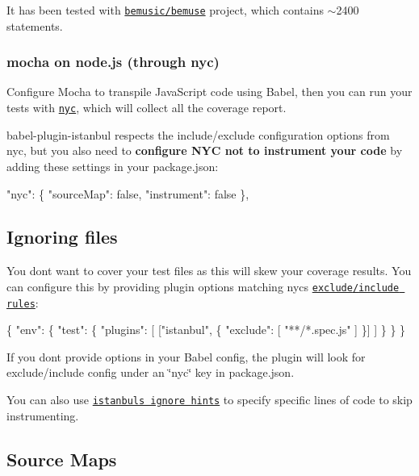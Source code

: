 It has been tested with \href{https://codecov.io/github/bemusic/bemuse}{\tt bemusic/bemuse} project, which contains $\sim$2400 statements.

\subsubsection*{mocha on node.\+js (through nyc)}

Configure Mocha to transpile Java\+Script code using Babel, then you can run your tests with \href{https://github.com/bcoe/nyc}{\tt {\ttfamily nyc}}, which will collect all the coverage report.

babel-\/plugin-\/istanbul respects the {\ttfamily include}/{\ttfamily exclude} configuration options from nyc, but you also need to {\bfseries configure N\+YC not to instrument your code} by adding these settings in your {\ttfamily package.\+json}\+:


\begin{DoxyCode}
"nyc": \{
  "sourceMap": false,
  "instrument": false
\},
\end{DoxyCode}


\subsection*{Ignoring files}

You don\textquotesingle{}t want to cover your test files as this will skew your coverage results. You can configure this by providing plugin options matching nyc\textquotesingle{}s \href{https://github.com/bcoe/nyc#excluding-files}{\tt {\ttfamily exclude}/{\ttfamily include} rules}\+:


\begin{DoxyCode}
\{
  "env": \{
    "test": \{
      "plugins": [
        ["istanbul", \{
          "exclude": [
            "**/*.spec.js"
          ]
        \}]
      ]
    \}
  \}
\}
\end{DoxyCode}


If you don\textquotesingle{}t provide options in your Babel config, the plugin will look for {\ttfamily exclude}/{\ttfamily include} config under an {\ttfamily \char`\"{}nyc\char`\"{}} key in {\ttfamily package.\+json}.

You can also use \href{https://github.com/gotwarlost/istanbul/blob/master/ignoring-code-for-coverage.md#ignoring-code-for-coverage-purposes}{\tt istanbul\textquotesingle{}s ignore hints} to specify specific lines of code to skip instrumenting.

\subsection*{Source Maps}

